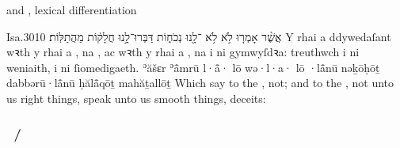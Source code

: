 \begin{frame}{\ex {} and , lexical differentiation}
	\begin{example}{Isa.}{30}{10}{}{}
		\quoling
		{אֲשֶׁ֨ר אָמְר֤וּ  לֹ֣א   לֹ֥א ־לָ֖נוּ נְכֹח֑וֹת דַּבְּרוּ־לָ֣נוּ חֲלָק֔וֹת  מַהֲתַלּֽוֹת׃}
		{Y rhai a ddywedaſant wꝛth y rhai a , na , ac wꝛth y rhai a , na  i ni gymwyſdꝛa: treuthwch i ni weniaith,  i ni ſiomedigaeth.}
		{ʾăšɛr ʾå̄mrū l·å̄· lō  wə·l·a· lō ·lå̄nū nəḵōḥōṯ dabbərū·lå̄nū ḥălå̄qōṯ  mahăṯallōṯ}
		{Which say to the ,  not; and to the ,  not unto us right things, speak unto us smooth things,  deceits:}
	\end{example}
\end{frame}



\subsubsection{~/ }

\subsubsection{}

\subsubsection{}

\subsubsection{}
